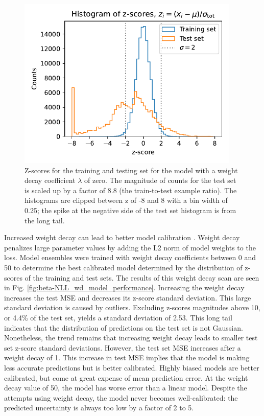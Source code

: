 \begin{figure}
	\centering
	\includegraphics[width=300pt]{figures/z-score_wd-0_paperplot.pdf}
	\caption[Z-score distributions for the training and test sets for $\lambda = 0$]{\label{fig:z-score_wd-0_paperplot}Z-scores for the training and testing set for the model with a weight decay coefficient $\lambda$ of zero. The magnitude of counts for the test set is scaled up by a factor of 8.8 (the train-to-test example ratio). The histograms are clipped between z of -8 and 8 with a bin width of 0.25; the spike at the negative side of the test set histogram is from the long tail.}
\end{figure}

Increased weight decay can lead to better model calibration \cite{guo_calibration_2017}. Weight decay penalizes large parameter values by adding the L2 norm of model weights to the loss. Model ensembles were trained with weight decay coefficients between 0 and 50 to determine the best calibrated model determined by the distribution of z-scores of the training and test sets. The results of this weight decay scan are seen in Fig. \ref{fig:beta-NLL_wd_model_performance}. Increasing the weight decay increases the test MSE and decreases its z-score standard deviation. This large standard deviation is caused by outliers. Excluding z-scores magnitudes above 10, or 4.4\% of the test set, yields a standard deviation of 2.53. This long tail indicates that the distribution of predictions on the test set is not Gaussian. Nonetheless, the trend remains that increasing weight decay leads to smaller test set z-score standard deviations. However, the test set MSE increases after a weight decay of 1. This increase in test MSE implies that the model is making less accurate predictions but is better calibrated. Highly biased models are better calibrated, but come at great expense of mean prediction error. At the weight decay value of 50, the model has worse error than a linear model. Despite the attempts using weight decay, the model never becomes well-calibrated: the predicted uncertainty is always too low by a factor of 2 to 5. 

